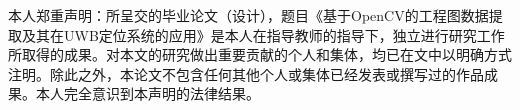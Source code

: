\newpage

\centerline{\heiti{}}


\vskip 3cm 


\begin{spacing}{2.0}
本人郑重声明：所呈交的毕业论文（设计），题目《基于OpenCV的工程图数据提取及其在UWB定位系统的应用》是本人在指导教师的指导下，独立进行研究工作所取得的成果。对本文的研究做出重要贡献的个人和集体，均已在文中以明确方式注明。除此之外，本论文不包含任何其他个人或集体已经发表或撰写过的作品成果。本人完全意识到本声明的法律结果。

\vskip 3cm

{}
\end{spacing}


